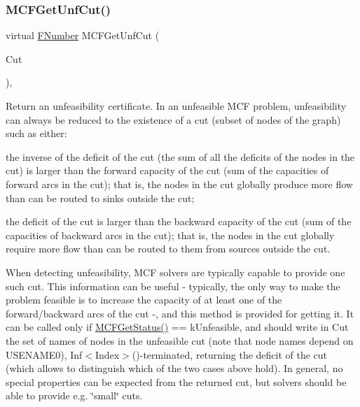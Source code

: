 \subsubsection{\texorpdfstring{M\+C\+F\+Get\+Unf\+Cut()}{MCFGetUnfCut()}}
{\footnotesize\ttfamily virtual \mbox{\hyperlink{class_m_c_f_class_aeea3e5951d222b2a8e57de1b4246a909}{F\+Number}} M\+C\+F\+Get\+Unf\+Cut (\begin{DoxyParamCaption}\item[{\mbox{\hyperlink{class_m_c_f_class_ace3388eb329ff0551a0b86b6c67e33d8}{Index\+\_\+\+Set}}}]{Cut }\end{DoxyParamCaption})\hspace{0.3cm}{\ttfamily [inline]}, {\ttfamily [virtual]}}

Return an unfeasibility certificate. In an unfeasible M\+CF problem, unfeasibility can always be reduced to the existence of a cut (subset of nodes of the graph) such as either\+:


\begin{DoxyItemize}
\item the inverse of the deficit of the cut (the sum of all the deficits of the nodes in the cut) is larger than the forward capacity of the cut (sum of the capacities of forward arcs in the cut); that is, the nodes in the cut globally produce more flow than can be routed to sinks outside the cut;
\item the deficit of the cut is larger than the backward capacity of the cut (sum of the capacities of backward arcs in the cut); that is, the nodes in the cut globally require more flow than can be routed to them from sources outside the cut.
\end{DoxyItemize}

When detecting unfeasibility, M\+CF solvers are typically capable to provide one such cut. This information can be useful -\/ typically, the only way to make the problem feasible is to increase the capacity of at least one of the forward/backward arcs of the cut -\/, and this method is provided for getting it. It can be called only if \mbox{\hyperlink{class_m_c_f_class_a333e27ad7a73779b096cb70829cbe8be}{M\+C\+F\+Get\+Status()}} == k\+Unfeasible, and should write in Cut the set of names of nodes in the unfeasible cut (note that node names depend on U\+S\+E\+N\+A\+M\+E0), Inf$<$\+Index$>$()-\/terminated, returning the deficit of the cut (which allows to distinguish which of the two cases above hold). In general, no special properties can be expected from the returned cut, but solvers should be able to provide e.\+g. \char`\"{}small\char`\"{} cuts.

